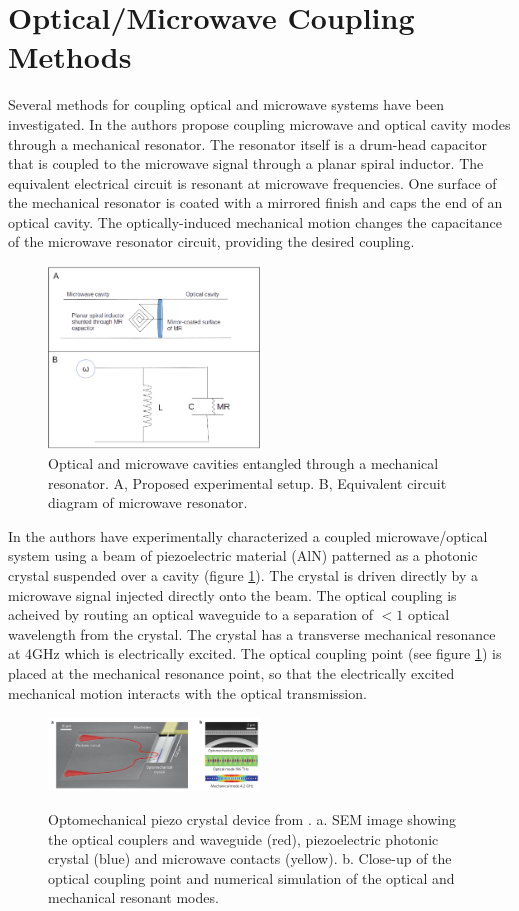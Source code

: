 \documentclass[a4paper,11pt, twocolumn]{article}
\numberwithin{equation}{section}
\begin{document}
\section{Optical/Microwave Coupling Methods}
Several methods for coupling optical and microwave systems have been investigated. 
In \cite{nanoMR} the authors propose coupling microwave and optical cavity modes through a mechanical resonator.
The resonator itself is a drum-head capacitor that is coupled to the microwave signal through a planar spiral inductor. 
The equivalent electrical circuit is resonant at microwave frequencies.
One surface of the mechanical resonator is coated with a mirrored finish and caps the end of an optical cavity.
The optically-induced mechanical motion changes the capacitance of the microwave resonator circuit, providing the desired coupling.
\begin{figure}
 \caption{Optical and microwave cavities entangled through a mechanical resonator. A, Proposed experimental setup. B, Equivalent circuit diagram of microwave resonator.}
 \centering
   \includegraphics[width=0.5\textwidth]{figs/f1}
\end{figure}
In \cite{nanoCrystal} the authors have experimentally characterized a coupled microwave/optical system using a beam of piezoelectric material (AlN) patterned as a photonic crystal suspended over a cavity (figure \ref{fig:optoCrystal}).
The crystal is driven directly by a microwave signal injected directly onto the beam. 
The optical coupling is acheived by routing an optical waveguide to a separation of $<1$ optical wavelength from the crystal.
The crystal has a transverse mechanical resonance at 4GHz which is electrically excited.
The optical coupling point (see figure \ref{fig:optoCrystal}) is placed at the mechanical resonance point, so that the electrically excited mechanical motion interacts with the optical transmission.
\begin{figure}
 \caption{Optomechanical piezo crystal device from \cite{nanoCrystal}. a. SEM image showing the optical couplers and waveguide (red), piezoelectric photonic crystal (blue) and microwave contacts (yellow). b. Close-up of the optical coupling point and numerical simulation of the optical and mechanical resonant modes.}
 \centering
   \includegraphics[width=0.5\textwidth]{figs/OptoMechCrystal}
 \label{fig:optoCrystal}
\end{figure}
\end{document}
